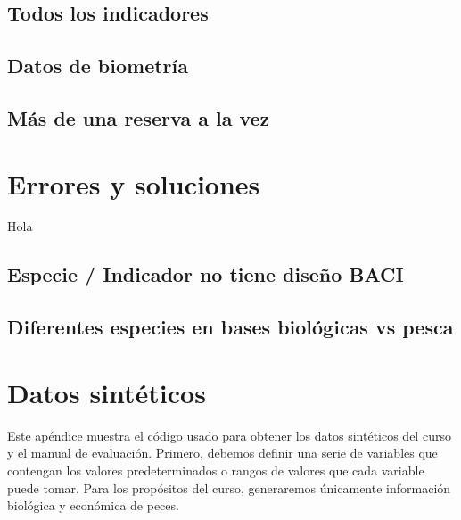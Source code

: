 \documentclass[]{krantz}
\begin{document}
\hypertarget{todos-los-indicadores}{%
\section{Todos los indicadores}\label{todos-los-indicadores}}

\hypertarget{datos-de-biometria}{%
\section{Datos de biometría}\label{datos-de-biometria}}

\hypertarget{mas-de-una-reserva-a-la-vez}{%
\section{Más de una reserva a la
vez}\label{mas-de-una-reserva-a-la-vez}}

\hypertarget{errores-y-soluciones}{%
\chapter{Errores y soluciones}\label{errores-y-soluciones}}

Hola

\hypertarget{especie-indicador-no-tiene-diseno-baci}{%
\section{Especie / Indicador no tiene diseño
BACI}\label{especie-indicador-no-tiene-diseno-baci}}

\hypertarget{diferentes-especies-en-bases-biologicas-vs-pesca}{%
\section{Diferentes especies en bases biológicas vs
pesca}\label{diferentes-especies-en-bases-biologicas-vs-pesca}}

\hypertarget{appendix-appendice}{%
\appendix {}}


\hypertarget{datos-sinteticos}{%
\chapter{Datos sintéticos}\label{datos-sinteticos}}

Este apéndice muestra el código usado para obtener los datos sintéticos
del curso y el manual de evaluación. Primero, debemos definir una serie
de variables que contengan los valores predeterminados o rangos de
valores que cada variable puede tomar. Para los propósitos del curso,
generaremos únicamente información biológica y económica de peces.
\end{document}
